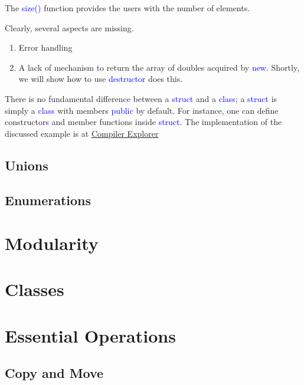 \documentclass{article}
\newcommand{\be}[1]{\textcolor{blue}{#1}}
\begin{document}
The \be{size()} function provides the users with the number of elements.

Clearly, several aspects are missing.
\begin{enumerate}
	\item Error handling
	\item A lack of mechanism to return the array of doubles acquired by \be{new}. Shortly, we will show how to use \be{destructor} does this.
\end{enumerate}
There is no fundamental difference between a \be{struct} and a \be{class}; a \be{struct} is simply a \be{class} with members \be{public} by default. For instance, one can define constructors and member functions inside \be{struct}.
 The implementation of the discussed example is at 
\href{https://godbolt.org/z/E6M64s}{Compiler Explorer}
\subsection{Unions}


\subsection{Enumerations}
%

\section{Modularity}

\section{Classes}

\section{Essential Operations}
\subsection{Copy and Move}
\end{document}
